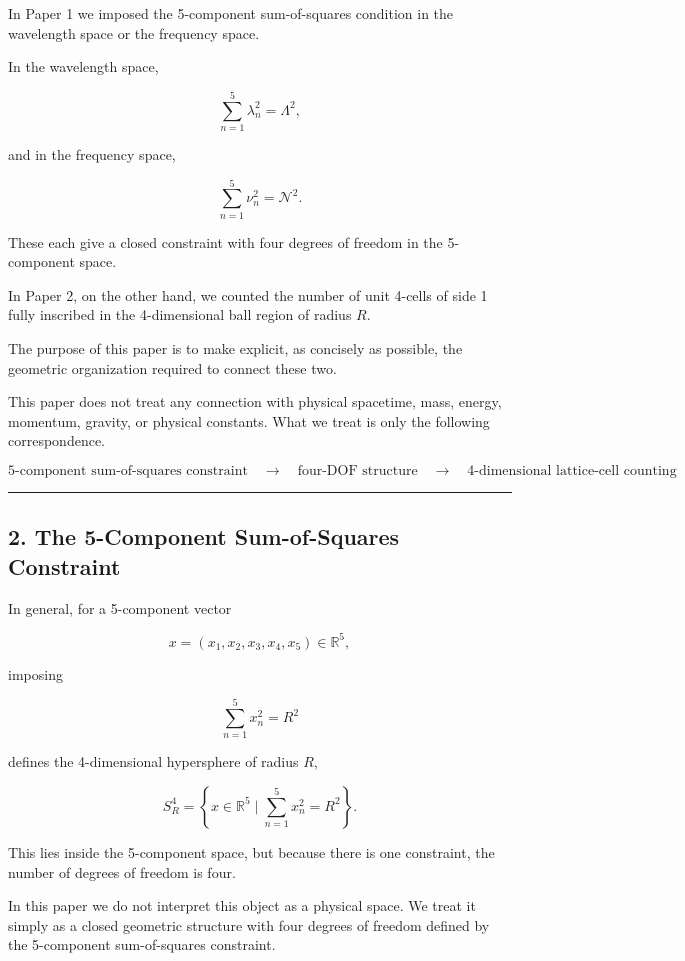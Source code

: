 \documentclass[
]{article}
\begin{document}
In Paper 1 we imposed the 5-component sum-of-squares condition in the
wavelength space or the frequency space.

In the wavelength space,

\[
\sum_{n=1}^{5}\lambda_n^2=\Lambda^2 ,
\]

and in the frequency space,

\[
\sum_{n=1}^{5}\nu_n^2=\mathcal{N}^2 .
\]

These each give a closed constraint with four degrees of freedom in the
5-component space.

In Paper 2, on the other hand, we counted the number of unit 4-cells of
side 1 fully inscribed in the 4-dimensional ball region of radius \(R\).

The purpose of this paper is to make explicit, as concisely as possible,
the geometric organization required to connect these two.

This paper does not treat any connection with physical spacetime, mass,
energy, momentum, gravity, or physical constants. What we treat is only
the following correspondence.

\[
\text{5-component sum-of-squares constraint}
\quad\longrightarrow\quad
\text{four-DOF structure}
\quad\longrightarrow\quad
\text{4-dimensional lattice-cell counting}
\]

\begin{center}\rule{0.5\linewidth}{0.5pt}\end{center}

\subsection{2. The 5-Component Sum-of-Squares
Constraint}\label{the-5-component-sum-of-squares-constraint}

In general, for a 5-component vector

\[
x=(x_1,x_2,x_3,x_4,x_5)\in\mathbb{R}^5 ,
\]

imposing

\[
\sum_{n=1}^{5}x_n^2=R^2
\]

defines the 4-dimensional hypersphere of radius \(R\),

\[
S^4_R
=
\left\{
x\in\mathbb{R}^5
\mid
\sum_{n=1}^{5}x_n^2=R^2
\right\} .
\]

This lies inside the 5-component space, but because there is one
constraint, the number of degrees of freedom is four.

In this paper we do not interpret this object as a physical space. We
treat it simply as a closed geometric structure with four degrees of
freedom defined by the 5-component sum-of-squares constraint.
\end{document}
